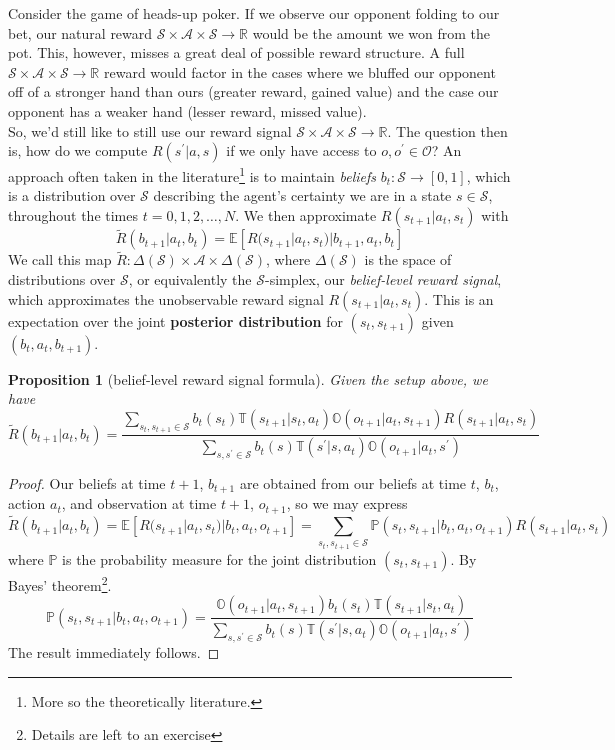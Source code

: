 \documentclass[12pt]{article}
\newtheorem{proposition}{Proposition}
\begin{document}
Consider the game of heads-up poker. If we observe our opponent folding to our bet, our natural reward $\mathcal{S} \times 
\mathcal{A} \times \mathcal{S} \to \mathbb{R}$ would be the amount we won from the pot. This, however, misses a great deal 
of possible reward structure. A full $\mathcal{S} \times \mathcal{A} \times \mathcal{S} \to \mathbb{R}$ reward would factor in 
the cases where we bluffed our opponent off of a stronger hand than ours (greater reward, gained value) and the case our 
opponent has a weaker hand (lesser reward, missed value). \\ 

So, we'd still like to still use our reward signal $\mathcal{S} \times \mathcal{A} \times \mathcal{S} \to \mathbb{R}$. The question 
then is, how do we compute $R(s^\prime | a, s)$ if we only have access to $o, o^\prime \in \mathcal{O}$? An approach often
taken in the literature\footnote{
    More so the theoretically literature.
} is to maintain \textit{beliefs} $b_t: \mathcal{S} \to [0,1]$, which is a distribution over $\mathcal{S}$ describing the 
agent's certainty we are in a state $s \in \mathcal{S}$, throughout the times $t = 0, 1, 2, \dots, N$. We then approximate 
$R(s_{t+1} | a_t, s_t)$ with 
$$
\tilde{R}(b_{t+1} | a_t, b_t) = \mathbb{E}[R(s_{t+1} | a_t, s_t) | b_{t+1}, a_t, b_t] 
$$
We call this map $\tilde{R}: \Delta(\mathcal{S}) \times \mathcal{A} \times \Delta(\mathcal{S})$, where $\Delta(\mathcal{S})$ is 
the space of distributions over $\mathcal{S}$, or equivalently the $\mathcal{S}$-simplex, our \textit{belief-level reward signal}, 
which approximates the unobservable reward signal $R(s_{t+1} | a_t, s_t)$. This is an expectation over the joint \textbf{posterior 
distribution} for $(s_t, s_{t+1})$ given $(b_t, a_t, b_{t+1})$. 

\begin{proposition}[belief-level reward signal formula]
    Given the setup above, we have 
    $$
    \tilde{R}(b_{t+1} | a_t, b_t) = \frac
    {\sum_{s_t, s_{t+1} \in \mathcal{S}} b_t(s_t) \mathbb{T}(s_{t+1} | s_t, a_t) \mathbb{O}(o_{t+1} | a_t, s_{t+1}) R(s_{t+1} | a_t, s_t)}
    {\sum_{s, s^\prime \in \mathcal{S}} b_t(s) \mathbb{T}(s^\prime | s, a_t) \mathbb{O}(o_{t+1} | a_t, s^\prime)} 
    $$
\end{proposition}

\begin{proof}
    Our beliefs at time $t+1$, $b_{t+1}$ are obtained from our beliefs at time $t$, $b_t$, action $a_t$, and observation at time 
    $t+1$, $o_{t+1}$, so we may express
    $$
    \tilde{R}(b_{t+1} | a_t, b_t)  = \mathbb{E}[R(s_{t+1} | a_t, s_t) | b_t, a_t, o_{t+1}] 
    = \sum_{s_t, s_{t+1} \in \mathcal{S}} \mathbb{P}(s_t, s_{t+1} | b_t, a_t, o_{t+1}) R(s_{t+1} | a_t, s_t)
    $$
    where $\mathbb{P}$ is the probability measure for the joint distribution $(s_t, s_{t+1})$. By Bayes' theorem\footnote{
    Details are left to an exercise}. 
    $$
    \mathbb{P}(s_t, s_{t+1} | b_t, a_t, o_{t+1}) 
    = \frac{\mathbb{O}(o_{t+1} | a_t, s_{t+1})b_t(s_t) \mathbb{T}(s_{t+1} | s_t, a_t)}
    {\sum_{s, s^\prime \in \mathcal{S}} b_t(s) \mathbb{T}(s^\prime | s, a_t) \mathbb{O}(o_{t+1} | a_t, s^\prime)} 
    $$
    The result immediately follows.     
\end{proof}
\end{document}
